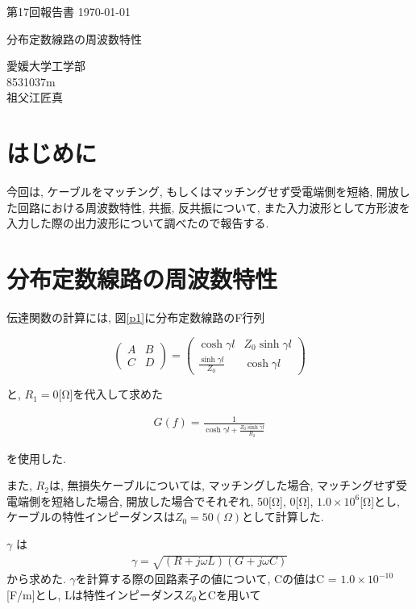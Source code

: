 \documentclass[a4j,12pt,]{jarticle}
\begin{document}
{\noindent\small 第17回報告書 \hfill\today}
\begin{center}
  {\Large 分布定数線路の周波数特性}
\end{center}
\begin{flushright}
  愛媛大学工学部 \\
  8531037m \\
  祖父江匠真 \\
\end{flushright}

\section{はじめに}

今回は, ケーブルをマッチング, もしくはマッチングせず受電端側を短絡, 開放した回路における周波数特性, 共振, 反共振について, また入力波形として方形波を入力した際の出力波形について調べたので報告する.

\section{分布定数線路の周波数特性}

伝達関数の計算には, 図\ref{p1}に分布定数線路のF行列

\large
\[
  \left(
  \begin{array}{cc}
      A & B \\
      C & D
    \end{array}
  \right) =
  \left(
  \begin{array}{cc}
      \cosh\gamma l             & Z_0\sinh\gamma l \\
      \frac{\sinh\gamma l}{Z_0} & \cosh\gamma l
    \end{array}
  \right)
\]
\normalsize

と, $R_1 = 0$[Ω]を代入して求めた

\large
\begin{eqnarray}
  G(f) =  \frac{1}{\cosh\gamma l + \frac{Z_0\sinh\gamma l}{R_2}}
\end{eqnarray}
\normalsize

を使用した.

また, $R_2$は, 無損失ケーブルについては, マッチングした場合, マッチングせず受電端側を短絡した場合, 開放した場合でそれぞれ, 50[Ω], 0[Ω], $1.0 × 10^{6}$[Ω]とし, ケーブルの特性インピーダンスは$Z_0 = 50(Ω)$として計算した.

$\gamma$ は
\begin{eqnarray}
  \gamma =  \sqrt{(R + j\omega L)(G + j\omega C)}
\end{eqnarray}
から求めた.
$\gamma$を計算する際の回路素子の値について, Cの値はC = $1.0 × 10^{-10}$[F/m]とし, Lは特性インピーダンス$Z_0$とCを用いて
\end{document}
